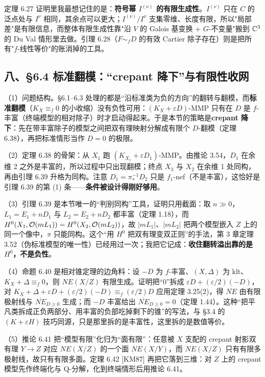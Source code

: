 定理 6.27 证明里我最想记住的是：\textbf{符号幂 $I^{(\nu)}$ 的有限生成性}。$I^{(\nu)}$ 只在 $C$ 的泛点处与 $I^\nu$ 相同，其余点可以更大；$I^{(\nu)}/I^{\nu}$ 支集零维、长度有限，所以"局部差"是有限信息，而整体有限生成性靠"沿 $V$ 的 Galois 基变换 + $G$-不变量"搬到 $\mathbb{C}^3$ 的 Du Val 情形里去做。引理 6.28（$F\sim_f D$ 的有效 Cartier 除子存在）则是把所有"$f$-线性等价"的账消掉的工具。

\subsection*{八、\S6.4 标准翻模：“crepant 降下”与有限性收网}

（1）问题结构。\S6.1--6.3 处理的都是“沿标准类为负的方向”的翻转与翻模，而\textbf{标准翻模}（$K_X\equiv_f 0$ 的小收缩）没有负性可用：$(K_X+\varepsilon D)$-MMP 只有在 $D$ 是 $f$-丰富（终端模型的相对除子）时才启动得起来。于是本节的策略是\textbf{crepant 降下}：先在带丰富除子的模型之间把双有理映射分解成有限个 $D$-翻模（定理 6.38），再把标准情形当作 $D=0$ 的极限。

（2）定理 6.38 的骨架：从 $X_1$ 跑 $(K_{X_1}+\varepsilon D_1)$-MMP。由推论 3.54，$D_1$ 在余维 2 之外是丰富的，所以过程中只出现翻模；终点 $X_3$ 与 $X_2$ 在余维 1 处同构，再由引理 6.39 升格为同构。注意 $D_1=\pi_*^{-1}D_2$ 只是 $f_1$-nef（不是丰富），这恰好是引理 6.39 的第 (1) 条——\textbf{条件被设计得刚好够用}。

（3）引理 6.39 是本节唯一的“判别同构”工具，证明只用截面：取 $n\gg0$，$L_1=E_1+nD_1$ 与 $L_2=E_2+nD_2$ 都丰富（定理 1.18），而 $H^0(X_1,\mathcal{O}(mL_1))=H^0(X_2,\mathcal{O}(mL_2))$，故 $|mL_1|$、$|mL_2|$ 把两个模型嵌入 $Z$ 上的同一个像中，$\pi$ 只能同构。这个“用 $H^0$ 把双有理变双正则”的手法，第 3 章定理 3.52（伪标准模型的唯一性）已经用过一次；我把它记成：\textbf{收住翻转溢出靠的是 $H^0$，不是负性}。

（4）命题 6.40 是相对锥定理的边角料：设 $-D$ 为 $f$-丰富、$(X,\Delta)$ 为 klt、$K_X+\Delta\equiv_f0$，则 $NE(X/Z)$ 有限生成。证明把“$0$”拆成 $\varepsilon D+(\varepsilon/2)(-D)$，对 $K_X+\Delta+\varepsilon D+(\varepsilon/2)(-D)\equiv_f(\varepsilon/2)D$ 应用定理 3.25(2)，得 $\overline{NE}$ 由有限极射线与 $\overline{NE}_{D\ge0}$ 生成；而 $-D$ 丰富给出 $\overline{NE}_{D\ge0}=0$（定理 1.44）。这种“把平凡类拆成正负两部分、用丰富的负部吃掉剩下的锥”的写法，与 \S3.4 的 $(K+\varepsilon H)$ 技巧同源，只是那里拆的是丰富性，这里拆的是数值等价。

（5）推论 6.41 把“模型有限”化归为“面有限”：任意被 $X$ 支配的 crepant 射影双有理 $Y\to Z$ 对应 $NE(X/Z)$ 的一个面 $NE(X/Y)$，而 $NE(X/Z)$ 只有有限多极射线，故只有有限多面。定理 6.42 [KM87] 再把它落到三维：对 $Z$ 上的 crepant 模型先作终端化与 Q-分解，化到终端情形后用推论 6.41。

